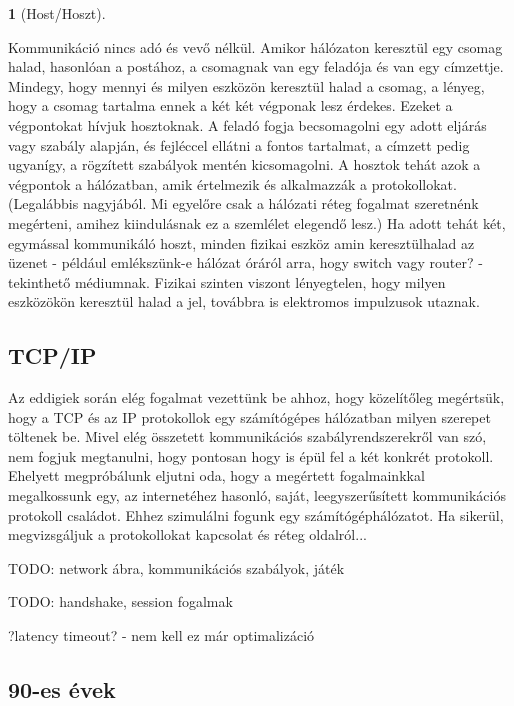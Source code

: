 \documentclass[a4paper, 12pt, oneside]{article}
\newtheorem*{defin}{}
\begin{document}
\begin{center}
\begin{defin}[Host/Hoszt]
\end{defin}
\end{center}

Kommunikáció nincs adó és vevő nélkül. Amikor hálózaton keresztül egy csomag halad, hasonlóan a postához, a csomagnak van egy feladója és van egy címzettje. Mindegy, hogy mennyi és milyen eszközön keresztül halad a csomag, a lényeg, hogy a csomag tartalma ennek a két két végponak lesz érdekes. Ezeket a végpontokat hívjuk hosztoknak. A feladó fogja becsomagolni egy adott eljárás vagy szabály alapján, és fejléccel ellátni a fontos tartalmat, a címzett pedig ugyanígy, a rögzített szabályok mentén kicsomagolni. A hosztok tehát azok a végpontok a hálózatban, amik értelmezik és alkalmazzák a protokollokat. (Legalábbis nagyjából. Mi egyelőre csak a hálózati réteg fogalmat szeretnénk megérteni, amihez kiindulásnak ez a szemlélet elegendő lesz.) Ha adott tehát két, egymással kommunikáló hoszt, minden fizikai eszköz amin keresztülhalad az üzenet - például emlékszünk-e hálózat óráról arra, hogy switch vagy router? - tekinthető médiumnak. Fizikai szinten viszont lényegtelen, hogy milyen eszközökön keresztül halad a jel, továbbra is elektromos impulzusok utaznak.

\subsection*{TCP/IP}

Az eddigiek során elég fogalmat vezettünk be ahhoz, hogy közelítőleg megértsük, hogy a TCP és az IP protokollok egy számítógépes hálózatban milyen szerepet töltenek be. Mivel elég összetett kommunikációs szabályrendszerekről van szó, nem fogjuk megtanulni, hogy pontosan hogy is épül fel a két konkrét protokoll. Ehelyett megpróbálunk eljutni oda, hogy a megértett fogalmainkkal megalkossunk egy, az internetéhez hasonló, saját, leegyszerűsített kommunikációs protokoll családot. Ehhez szimulálni fogunk egy számítógéphálózatot. Ha sikerül, megvizsgáljuk a protokollokat kapcsolat és réteg oldalról...

TODO: network ábra, kommunikációs szabályok, játék

TODO: handshake, session fogalmak

?latency timeout? - nem kell ez már optimalizáció

\subsection*{90-es évek}
\end{document}
